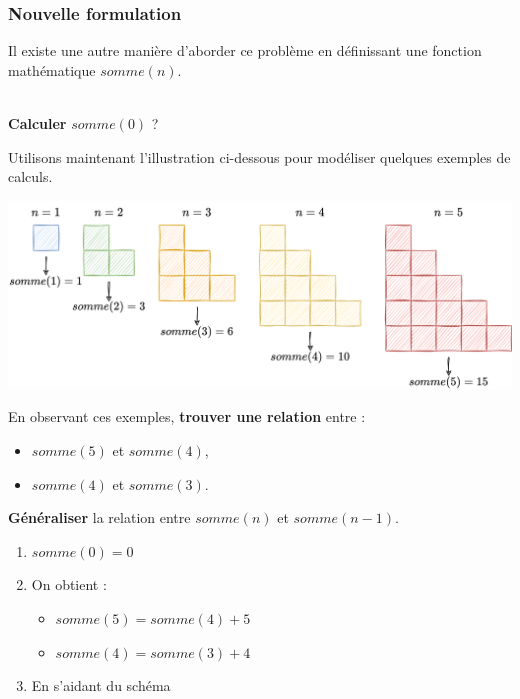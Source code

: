 \documentclass[a4paper,17pt]{extarticle}
\newenvironment{eleve}%
{\begin{activite}\color{noiramu}\\[-0.5cm]}
{\end{activite}}
\providecommand{\tightlist}{%
      \setlength{\itemsep}{0pt}\setlength{\parskip}{0pt}}
\begin{document}
    \hypertarget{nouvelle-formulation}{%
\subsubsection{Nouvelle formulation}\label{nouvelle-formulation}}

Il existe une autre manière d'aborder ce problème en définissant une
fonction mathématique \(somme(n)\).
\begin{eleve}
    \textbf{Calculer} \(somme(0)\) ?

Utilisons maintenant l'illustration ci-dessous pour modéliser quelques
exemples de calculs.

\includegraphics{res/somme.png}

En observant ces exemples, \textbf{trouver une relation} entre :

\begin{itemize}
\tightlist
\item
  \(somme(5)\) et \(somme(4)\),
\item
  \(somme(4)\) et \(somme(3)\).
\end{itemize}

\textbf{Généraliser} la relation entre \(somme(n)\) et \(somme(n-1)\).
        
        \end{eleve}\begin{reponse}
    \begin{enumerate}
\def\labelenumi{\arabic{enumi}.}
\tightlist
\item
  \(somme(0) = 0\)
\item
  On obtient :

  \begin{itemize}
  \tightlist
  \item
    \(somme(5) = somme(4) + 5\)
  \item
    \(somme(4) = somme(3) + 4\)
  \end{itemize}
\item
  En s'aidant du schéma
\end{enumerate}


\end{reponse}
\end{document}
